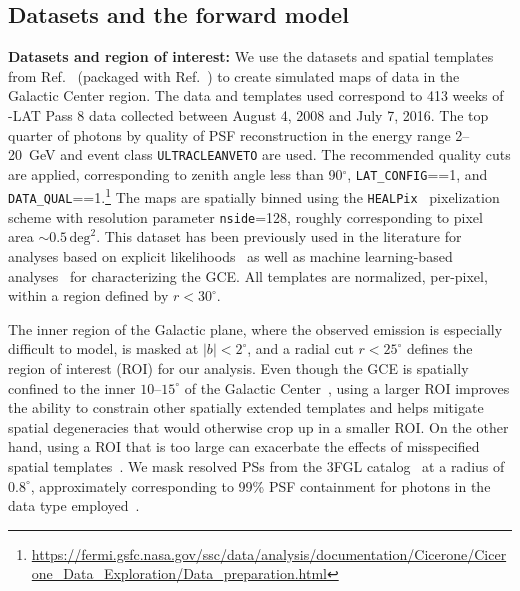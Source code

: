 \documentclass[prd,aps,10pt,nofootinbib,twocolumn,superscriptaddress,preprintnumbers,balancelastpage,longbibliography]{revtex4-1}
\begin{document}
\subsection{Datasets and the forward model}
\label{sec:datasets}

\noindent
\textbf{Datasets and region of interest:} We use the datasets and spatial templates from Ref.~\cite{rodd_nicholas_safdi_siddharth_2016} (packaged with Ref.~\cite{Mishra-Sharma:2016gis}) to create simulated maps of \Fermi data in the Galactic Center region. The data and templates used correspond to 413 weeks of \Fermi-LAT Pass 8 data collected between August 4, 2008 and July 7, 2016. The top quarter of photons by quality of PSF reconstruction in the energy range 2--20~GeV and event class \texttt{ULTRACLEANVETO} are used. The recommended quality cuts are applied, corresponding to zenith angle less than 90$^\circ$, \texttt{LAT\_CONFIG}==1, and \texttt{DATA\_QUAL}==1.\footnote{\url{https://fermi.gsfc.nasa.gov/ssc/data/analysis/documentation/Cicerone/Cicerone_Data_Exploration/Data_preparation.html}} The maps are spatially binned using the \texttt{HEALPix}~\cite{Gorski:2004by} pixelization scheme with resolution parameter \texttt{nside}=128, roughly corresponding to pixel area $\sim 0.5\,\mathrm{deg}^2$. This dataset has been previously used in the literature for analyses based on explicit likelihoods~\cite{Buschmann:2020adf,Chang:2019ars,Leane:2019xiy} as well as machine learning-based analyses~\cite{List:2020mzd} for characterizing the GCE. All templates are normalized, per-pixel, within a region defined by $r < 30^\circ$.

The inner region of the Galactic plane, where the observed emission is especially difficult to model, is masked at $|b| < 2^\circ$, and a radial cut $r < 25^\circ$ defines the region of interest (ROI) for our analysis. Even though the GCE is spatially confined to the inner $10\mbox{--}15^\circ$ of the Galactic Center~\cite{Daylan:2014rsa,Calore:2014xka}, using a larger ROI improves the ability to constrain other spatially extended templates and helps mitigate spatial degeneracies that would otherwise crop up in a smaller ROI. On the other hand, using a ROI that is too large can exacerbate the effects of misspecified spatial templates~\cite{Chang:2018bpt}. We mask resolved PSs from the 3FGL catalog~\cite{Fermi-LAT:2015bhf} at a radius of $0.8^\circ$, approximately corresponding to 99\% PSF containment for photons in the data type employed~\cite{Fermi-LAT:2015bhf}. \\
\end{document}
